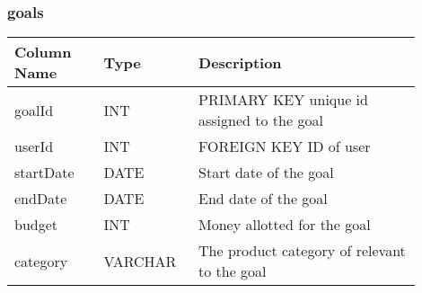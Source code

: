 \documentclass[12pt, titlepage]{article}
\begin{document}
\subsubsection{goals}
\begin{table}[H]
  \begin{tabular}{|p{0.2\linewidth}|p{0.2\linewidth}|p{0.5\linewidth}|}
    \hline
    \textbf{Column Name} & \textbf{Type} & \textbf{Description} \\
    \hline
    goalId & INT & PRIMARY KEY unique id assigned to the goal \\
    \hline
    userId & INT & FOREIGN KEY ID of user \\
    \hline
    startDate & DATE & Start date of the goal \\
    \hline
    endDate & DATE & End date of the goal \\
    \hline
    budget & INT & Money allotted for the goal \\
    \hline
    category & VARCHAR & The product category of relevant to the goal\\
    \hline
  \end{tabular}
\end{table}
\end{document}

